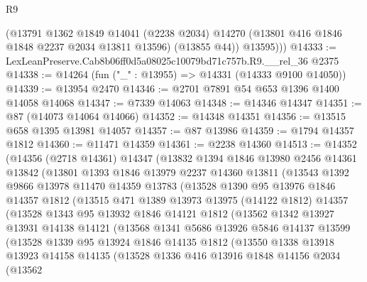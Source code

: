 \begin{lexlean}{R9}
\begin{coremodule}
          (@13791
            @1362
            @1849
            @14041
            (@2238 @2034)
            @14270
            (@13801 @416 @1846 @1848 @2237 @2034 @13811 @13596)
            (@13855 @44))
          @13595)))
@14333 := LexLeanPreserve.Cab8b06ff0d5a08025c10079bd71c757b.R9.__rel_36 @2375
@14338 := @14264 (fun ("_" : @13955) => @14331 (@14333 @9100 @14050))
@14339 := @13954 @2470
@14346 := @2701 @7891 @54 @653 @1396 @1400 @14058 @14068
@14347 := @7339 @14063
@14348 := @14346 @14347
@14351 := @87 (@14073 @14064 @14066)
@14352 := @14348 @14351
@14356 := @13515 @658 @1395 @13981 @14057
@14357 := @87 @13986
@14359 := @1794 @14357 @1812
@14360 := @11471 @14359
@14361 := @2238 @14360
@14513 := @14352
    (@14356
      (@2718 @14361)
      @14347
      (@13832
        @1394
        @1846
        @13980
        @2456
        @14361
        @13842
        (@13801
          @1393
          @1846
          @13979
          @2237
          @14360
          @13811
          (@13543
            @1392
            @9866
            @13978
            @11470
            @14359
            @13783
            (@13528
              @1390
              @95
              @13976
              @1846
              @14357
              @1812
              (@13515
                @471
                @1389
                @13973
                @13975
                (@14122 @1812)
                @14357
                (@13528
                  @1343
                  @95
                  @13932
                  @1846
                  @14121
                  @1812
                  (@13562
                    @1342
                    @13927
                    @13931
                    @14138
                    @14121
                    (@13568
                      @1341
                      @5686
                      @13926
                      @5846
                      @14137
                      @13599
                      (@13528
                        @1339
                        @95
                        @13924
                        @1846
                        @14135
                        @1812
                        (@13550
                          @1338
                          @13918
                          @13923
                          @14158
                          @14135
                          (@13528
                            @1336
                            @416
                            @13916
                            @1848
                            @14156
                            @2034
                            (@13562

\end{coremodule}
\end{lexlean}
